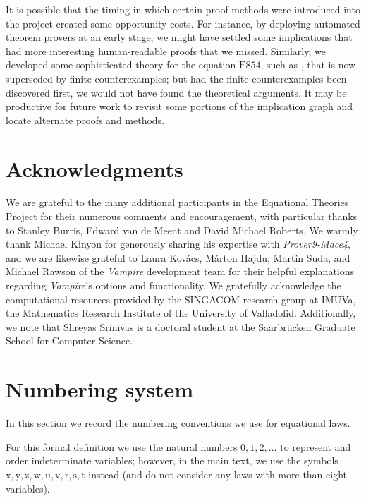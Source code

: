 \documentclass[12pt]{amsart}
\theoremstyle{definition}
\newcommand{\x}{\mathrm{x}}
\newcommand{\y}{\mathrm{y}}
\newcommand{\z}{\mathrm{z}}
\newcommand{\w}{\mathrm{w}}
\newcommand{\uu}{\mathrm{u}}
\newcommand{\vv}{\mathrm{v}}
\newcommand{\Eq}[1]{\mathrm{E}#1}
\begin{document}
It is possible that the timing in which certain proof methods were introduced into the project created some opportunity costs.  For instance, by deploying automated theorem provers at an early stage, we might have settled some implications that had more interesting human-readable proofs that we missed.  Similarly, we developed some sophisticated theory for the equation $\Eq{854}$, such as , that is now superseded by finite counterexamples; but had the finite counterexamples been discovered first, we would not have found the theoretical arguments.  It may be productive for future work to revisit some portions of the implication graph and locate alternate proofs and methods.


\section*{Acknowledgments}

We are grateful to the many additional participants in the Equational Theories Project for their
numerous comments and encouragement, with particular thanks to Stanley Burris, Edward van de Meent and David Michael Roberts. We warmly thank Michael Kinyon for generously sharing his expertise with \emph{Prover9-Mace4}, and we are likewise grateful to Laura Kovács, Márton Hajdu, Martin Suda, and Michael Rawson of the \emph{Vampire} development team for their helpful explanations regarding \emph{Vampire}'s options and functionality. We gratefully acknowledge the computational resources provided by the SINGACOM research group at IMUVa, the Mathematics Research Institute of the University of Valladolid. Additionally, we note that Shreyas Srinivas is a doctoral student at the Saarbr\"{u}cken Graduate School for Computer Science.


\appendix
{}
\raggedbottom
\section{Numbering system}\label{numbering-app}

In this section we record the numbering conventions we use for equational laws.

For this formal definition we use the natural numbers $0,1,2,\dots$ to represent and order indeterminate variables; however, in the main text, we use the symbols $\x,\y,\z,\w,\uu,\vv,\mathrm{r},\mathrm{s},\mathrm{t}$ instead (and do not consider any laws with more than eight variables).
\end{document}
